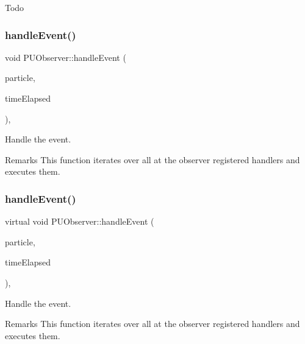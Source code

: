 Todo \mbox{\label{classPUObserver_a17d1b4aad5474b11a9aa20373e18189a}} 
\subsubsection{\texorpdfstring{handle\+Event()}{handleEvent()}\hspace{0.1cm}{\footnotesize\ttfamily [1/2]}}
{\footnotesize\ttfamily void P\+U\+Observer\+::handle\+Event (\begin{DoxyParamCaption}\item[{\hyperlink{structPUParticle3D}{P\+U\+Particle3D} $\ast$}]{particle,  }\item[{float}]{time\+Elapsed }\end{DoxyParamCaption})\hspace{0.3cm}{\ttfamily [protected]}, {\ttfamily [virtual]}}

Handle the event. \begin{DoxyRemark}{Remarks}
This function iterates over all at the observer registered handlers and executes them. 
\end{DoxyRemark}
\mbox{\label{classPUObserver_add59b575d5f91e3b1768b2dd5785991a}} 
\subsubsection{\texorpdfstring{handle\+Event()}{handleEvent()}\hspace{0.1cm}{\footnotesize\ttfamily [2/2]}}
{\footnotesize\ttfamily virtual void P\+U\+Observer\+::handle\+Event (\begin{DoxyParamCaption}\item[{\hyperlink{structPUParticle3D}{P\+U\+Particle3D} $\ast$}]{particle,  }\item[{float}]{time\+Elapsed }\end{DoxyParamCaption})\hspace{0.3cm}{\ttfamily [protected]}, {\ttfamily [virtual]}}

Handle the event. \begin{DoxyRemark}{Remarks}
This function iterates over all at the observer registered handlers and executes them. 
\end{DoxyRemark}
\mbox{\label{classPUObserver_a45f88a4df42b5812129f0cdb1acdef0b}} 
